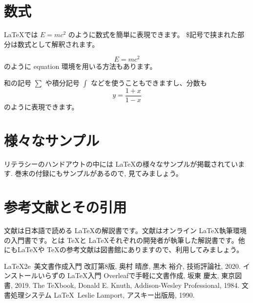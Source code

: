 \documentclass[platex,a4paper,12pt,dvipdfmx]{jsarticle}
\begin{document}
\section{数式}
\LaTeX では $E=mc^2$ のように数式を簡単に表現できます。 
\$記号で挟まれた部分は数式として解釈されます。

\begin{equation}
E=mc^2
\end{equation}
のように equation 環境を用いる方法もあります。

和の記号 $\sum$ や積分記号 $\int$ などを使うこともできますし、分数も
\begin{equation}
y=\frac{1+x}{1-x}
\end{equation}
のように表現できます。

\section{様々なサンプル}
リテラシーのハンドアウトの中には \LaTeX の様々なサンプルが掲載されています. 巻末の付録にもサンプルがあるので, 見てみましょう。

\section{参考文献とその引用}

文献\cite{okumura}は日本語で読める \LaTeX の解説書です。文献\cite{bando}はオンライン \LaTeX 執筆環境の入門書です。\cite{tex1}と\cite{lamport}は \TeX と \LaTeX それぞれの開発者が執筆した解説書です。他にも\LaTeX や \TeX の参考文献は図書館にありますので、利用してみましょう。

\begin{thebibliography}{99}
 \LaTeX2e\ 美文書作成入門 改訂第8版, 奥村 晴彦, 黒木 裕介, 技術評論社, 2020.
 インストールいらずの \LaTeX 入門 Overleafで手軽に文書作成, 坂東 慶太, 東京図書, 2019.
 The \TeX book, Donald E. Knuth, Addison-Wesley Professional, 1984.
 文書処理システム \LaTeX\ Leslie Lamport, アスキー出版局, 1990.
\end{thebibliography}
\end{document}
